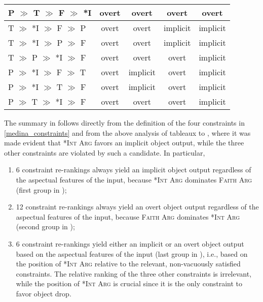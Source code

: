\begin{table}[htb]
\begin{tabular}{l|cccc}
P $\gg$ T $\gg$ F $\gg$ *I & overt  &  overt   & overt  & overt \\
\hline
T $\gg$ *I $\gg$ F $\gg$ P & overt  &  overt   & implicit  & implicit \\
T $\gg$ *I $\gg$ P $\gg$ F & overt  &  overt   & implicit  & implicit \\ 
T $\gg$ P $\gg$ *I $\gg$ F & overt  &  overt   & overt  & implicit \\
P $\gg$ *I $\gg$ F $\gg$ T & overt  &  implicit   & overt  & implicit \\
P $\gg$ *I $\gg$ T $\gg$ F & overt  &  implicit   & overt  & implicit \\
P $\gg$ T $\gg$ *I $\gg$ F & overt  &  overt   & overt  & implicit
\end{tabular}
\end{table}

The summary in  follows directly from the definition of the four constraints in \ref{medina_constraints} and from the above analysis of tableaux  to , where it was made evident that \textsc{*Int Arg} favors an implicit object output, while the three other constraints are violated by such a candidate. In particular,
\begin{enumerate}
    \item 6 constraint re-rankings always yield an implicit object output regardless of the aspectual features of the input, because \textsc{*Int Arg} dominates \textsc{Faith Arg} (first group in );
    \item 12 constraint re-rankings always yield an overt object output regardless of the aspectual features of the input, because \textsc{Faith Arg} dominates \textsc{*Int Arg} (second group in );
    \item 6 constraint re-rankings yield either an implicit or an overt object output based on the aspectual features of the input (last group in ), i.e., based on the position of \textsc{*Int Arg} relative to the relevant, non-vacuously satisfied constraints. The relative ranking of the three other constraints is irrelevant, while the position of \textsc{*Int Arg} is crucial since it is the only constraint to favor object drop.
\end{enumerate}

